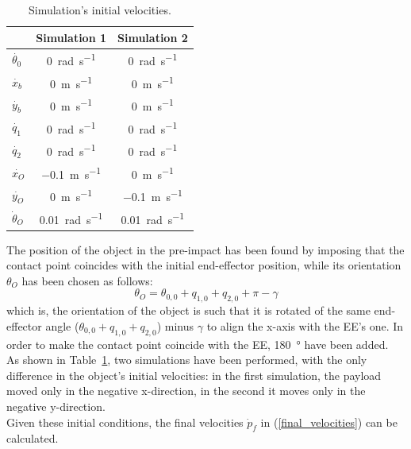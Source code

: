 \documentclass[a4paper,12pt,oneside]{report}
\begin{document}
\begin{table}
  \caption{Simulation's initial velocities.}
  \label{initial_velocities}
  \begin{center}
  \begin{tabular}{lcc}
    \toprule
    &\textbf{Simulation 1}&\textbf{Simulation 2}\\
  \midrule
  $\dot{\theta_0}$&\SI{0}{\radian\per\second}&\SI{0}{\radian\per\second}\\
  $\dot{x_b}$&\SI{0}{\metre\per\second}&\SI{0}{\metre\per\second}\\
  $\dot{y_b}$&\SI{0}{\metre\per\second}&\SI{0}{\metre\per\second}\\
  $\dot{q_1}$&\SI{0}{\radian\per\second}&\SI{0}{\radian\per\second}\\
  $\dot{q_2}$&\SI{0}{\radian\per\second}&\SI{0}{\radian\per\second}\\
  $\dot{x_O}$&\SI{-0.1}{\metre\per\second}&\SI{0}{\metre\per\second}\\
  $\dot{y_O}$&\SI{0}{\metre\per\second}&\SI{-0.1}{\metre\per\second}\\
  $\dot{\theta}_O$&\SI{0.01}{\radian\per\second}&\SI{0.01}{\radian\per\second}\\
  \bottomrule
  \end{tabular}
  \end{center}
\end{table}
The position of the object in the pre-impact has been found by imposing that the contact point coincides with the initial end-effector position, while its orientation $\theta_O$ has been chosen as follows:
\begin{equation}
  \theta_O=\theta_{0,0}+q_{1,0}+q_{2,0}+\pi-\gamma
  \label{contact_rotation}
\end{equation}
which is, the orientation of the object is such that it is rotated of the same end-effector angle ($\theta_{0,0}+q_{1,0}+q_{2,0}$) minus $\gamma$ to align the x-axis with the EE's one. In order to make the contact point coincide with the EE, \SI{180}{\degree} have been added.\\
As shown in Table~\ref{initial_velocities}, two simulations have been performed, with the only difference in the object's initial velocities: in the first simulation, the payload moved only in the negative x-direction, in the second it moves only in the negative y-direction.\\
Given these initial conditions, the final velocities $\dot{p}_f$ in (\ref{final_velocities}) can be calculated.\\
\end{document}

